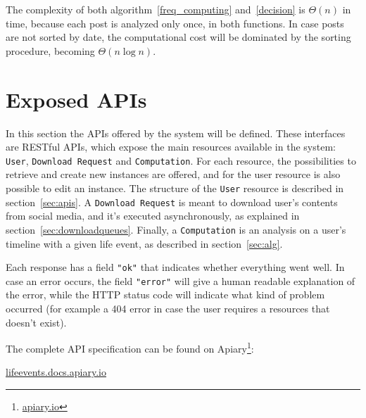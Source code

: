 The complexity of both algorithm~\ref{freq_computing} and~\ref{decision} is $\Theta(n)$ in time, because each post is analyzed only once, in both functions. In case posts are not sorted by date, the computational cost will be dominated by the sorting procedure, becoming $\Theta(n \log n)$.

\section{Exposed APIs}
\label{sec:APIs}

In this section the APIs offered by the system will be defined. These interfaces are RESTful APIs, which expose the main resources available in the system: \texttt{User}, \texttt{Download Request} and \texttt{Computation}. For each resource, the possibilities to retrieve and create new instances are offered, and for the user resource is also possible to edit an instance. The structure of the \texttt{User} resource is described in section~\ref{sec:apis}. A \texttt{Download Request} is meant to download user's contents from social media, and it's executed asynchronously, as explained in section~\ref{sec:downloadqueues}. Finally, a \texttt{Computation} is an analysis on a user's timeline with a given life event, as described in section~\ref{sec:alg}.

Each response has a field \texttt{"ok"} that indicates whether everything went well. In case an error occurs, the field \texttt{"error"} will give a human readable explanation of the error, while the HTTP status code will indicate what kind of problem occurred (for example a 404 error in case the user requires a resources that doesn't exist).

The complete API specification can be found on Apiary\footnote{\url{apiary.io}}:
\begin{center}
\url{lifeevents.docs.apiary.io}
\end{center}

